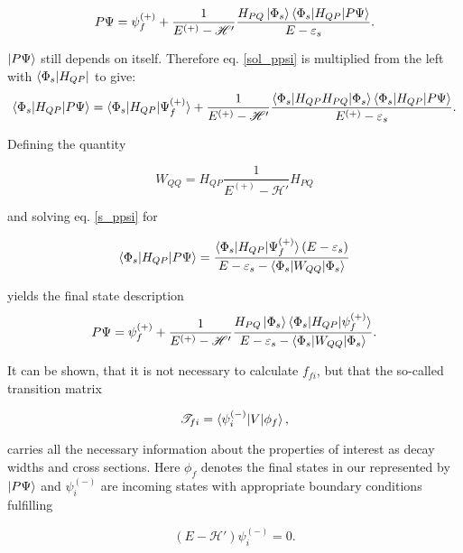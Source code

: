 \begin{equation}\label{sol_ppsi}
  P \Psi = \psi_f^{(+)} + \frac{1}{E^{(+)} - \mathscr{H}'}
           \frac{H_{PQ}\ket{\Phi_s}
           \braket{\Phi_s|H_{QP}|P\Psi}}{E - \varepsilon_s} .
\end{equation}

$\ket{P \Psi}$ still depends on itself. Therefore 
eq. \ref{sol_ppsi}
is multiplied from the left with $\bra{\Phi_s|H_{QP}}$ to give:
\begin{equation}
  \braket{\Phi_s|H_{QP}|P\Psi} = \braket{\Phi_s|H_{QP}|\Psi_f^{(+)}} +
  \frac{1}{E^{(+)} - \mathscr{H}'}
  \frac{\braket{\Phi_s|H_{QP}H_{PQ}|\Phi_s} \braket{\Phi_s|H_{QP}|P\Psi}}
       {E^{(+)} - \varepsilon_s}  \label{s_ppsi} .
\end {equation}

Defining the quantity

\begin{equation}
  W_{QQ} = H_{QP}\frac{1}{E^{(+)} - \mathscr{H}'}H_{PQ}
\end{equation}

and solving eq. \ref{s_ppsi} for

\begin{equation}
  \braket{\Phi_s|H_{QP}|P\Psi} = \frac{\braket{\Phi_s|H_{QP}|\Psi_f^{(+)}}(E-\varepsilon_s)}
{E - \varepsilon_s - \braket{\Phi_s|W_{QQ}|\Phi_s}}
\end{equation}

yields the final state description
\begin{equation}\label{}
  P \Psi = \psi_f^{(+)} + \frac{1}{E^{(+)} - \mathscr{H}'}
           \frac{H_{PQ}\ket{\Phi_s}
           \braket{\Phi_s|H_{QP}|\psi_f^{(+)}}}
           {E - \varepsilon_s - \braket{\Phi_s|W_{QQ}|\Phi_s}} .
\end{equation}

It can be shown, that it is not necessary to calculate $f_{fi}$, but that the
so-called transition matrix

\begin{equation}
  \mathscr{T}_{fi} = \braket{\psi_i^{(-)}|V|\phi_f},
\end{equation}

carries all the necessary information about the properties of interest as
decay widths and cross sections. \cite{Gell-Mann53}
Here $\phi_f$ denotes the final states in our represented by $\ket{P \Psi}$ and
$\psi_i^{(-)}$ are incoming states with appropriate boundary conditions fulfilling

\begin{equation}
  (E - \mathscr{H}') \psi_i^{(-)} = 0 .
\end{equation}

